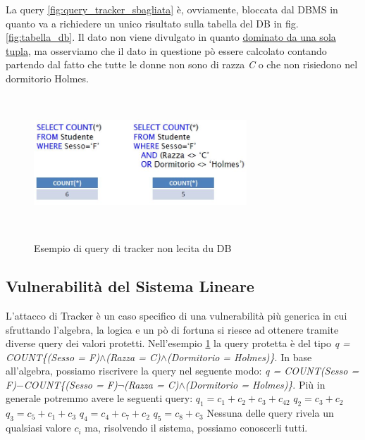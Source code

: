 La query \ref{fig:query_tracker_sbagliata} è, ovviamente, bloccata dal DBMS in quanto va a richiedere un unico risultato sulla tabella del DB in fig. \ref{fig:tabella_db}.
Il dato non viene divulgato in quanto \underline{dominato da una sola tupla}, ma osserviamo che il dato in questione pò essere calcolato contando partendo dal fatto che tutte le donne non sono di razza \textit{C} o che non risiedono nel dormitorio Holmes.

\begin{figure}[htpb]
\centering
	{\includegraphics[height=5cm, width=8cm, keepaspectratio]{Immagini/Capitolo10/prot_dati_14.JPG}}
		\caption{Esempio di query di tracker non lecita du DB
				  \label{fig:query_tracker}}  
\end{figure}

\subsection{Vulnerabilità del Sistema Lineare}
L'attacco di Tracker è un caso specifico di una vulnerabilità più generica in cui sfruttando l'algebra, la logica e un pò di fortuna si riesce ad ottenere tramite diverse query dei valori protetti.
\newpage
Nell'esempio \ref{fig:query_tracker} la query protetta è del tipo \textit{q = COUNT\{(Sesso = F)}$\wedge$\textit{(Razza = C)}$\wedge$\textit{(Dormitorio = Holmes)\}}.
\newline
In base all'algebra, possiamo riscrivere la query nel seguente modo: 
\textit{q = COUNT(Sesso = F)}$-$\textit{COUNT\{(Sesso = F)}$\neg$\textit{(Razza = C)}$\wedge$\textit{(Dormitorio = Holmes)\}}.
\newline
Più in generale potremmo avere le seguenti query:
\newline
$q_{1} = c_{1} + c_{2} + c_{3} + c_{42}$
\newline
$q_{2} = c_{3} + c_{2} $
\newline
$q_{3} = c_{5} + c_{1} + c_{3}$
\newline
$q_{4} = c_{4} + c_{7} + c_{2}$
\newline
$q_{5} = c_{8} + c_{3}$
Nessuna delle query rivela un qualsiasi valore $c_{i}$ ma, risolvendo il sistema, possiamo conoscerli tutti.

